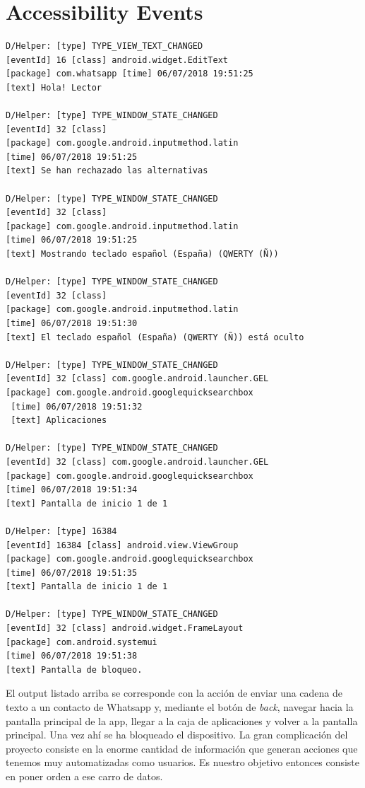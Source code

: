 \documentclass[12pt,a4paper,oneside]{book} %
\begin{document}
\section{Accessibility Events}
\begin{verbatim}
D/Helper: [type] TYPE_VIEW_TEXT_CHANGED 
[eventId] 16 [class] android.widget.EditText 
[package] com.whatsapp [time] 06/07/2018 19:51:25 
[text] Hola! Lector

D/Helper: [type] TYPE_WINDOW_STATE_CHANGED 
[eventId] 32 [class]  
[package] com.google.android.inputmethod.latin 
[time] 06/07/2018 19:51:25 
[text] Se han rechazado las alternativas

D/Helper: [type] TYPE_WINDOW_STATE_CHANGED 
[eventId] 32 [class]  
[package] com.google.android.inputmethod.latin 
[time] 06/07/2018 19:51:25 
[text] Mostrando teclado español (España) (QWERTY (Ñ))

D/Helper: [type] TYPE_WINDOW_STATE_CHANGED 
[eventId] 32 [class]
[package] com.google.android.inputmethod.latin 
[time] 06/07/2018 19:51:30 
[text] El teclado español (España) (QWERTY (Ñ)) está oculto

D/Helper: [type] TYPE_WINDOW_STATE_CHANGED 
[eventId] 32 [class] com.google.android.launcher.GEL 
[package] com.google.android.googlequicksearchbox 
 [time] 06/07/2018 19:51:32 
 [text] Aplicaciones
 
D/Helper: [type] TYPE_WINDOW_STATE_CHANGED 
[eventId] 32 [class] com.google.android.launcher.GEL 
[package] com.google.android.googlequicksearchbox 
[time] 06/07/2018 19:51:34 
[text] Pantalla de inicio 1 de 1

D/Helper: [type] 16384 
[eventId] 16384 [class] android.view.ViewGroup 
[package] com.google.android.googlequicksearchbox 
[time] 06/07/2018 19:51:35
[text] Pantalla de inicio 1 de 1

D/Helper: [type] TYPE_WINDOW_STATE_CHANGED 
[eventId] 32 [class] android.widget.FrameLayout 
[package] com.android.systemui 
[time] 06/07/2018 19:51:38 
[text] Pantalla de bloqueo.
\end{verbatim}
El output listado arriba se corresponde con la acción de enviar una cadena de texto a un contacto de Whatsapp y, mediante el botón de \textit{back}, navegar hacia la pantalla principal de la app, llegar a la caja de aplicaciones y volver a la pantalla principal. Una vez ahí se ha bloqueado el dispositivo. 
\newline \newline 
La gran complicación del proyecto consiste en la enorme cantidad de información que generan acciones que tenemos muy automatizadas como usuarios. Es nuestro objetivo entonces consiste en poner orden a ese carro de datos. 
\end{document}
